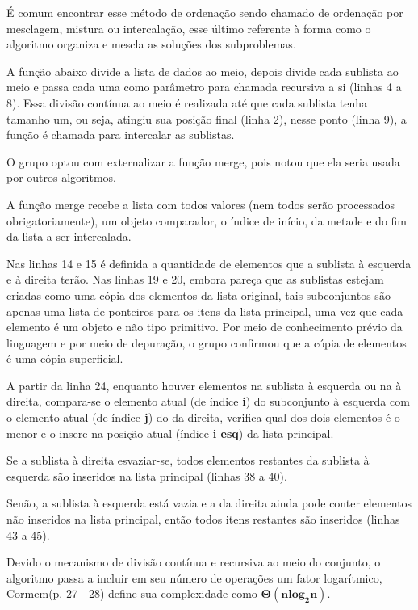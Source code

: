 \documentclass[a4paper,12pt]{scrartcl}
\begin{document}
É comum encontrar esse método de ordenação sendo chamado de ordenação por mesclagem, mistura ou intercalação, esse último referente à forma como o algoritmo organiza e mescla as soluções dos subproblemas.

A função  abaixo divide a lista de dados ao meio, depois divide cada sublista ao meio e passa cada uma como parâmetro para chamada recursiva a si (linhas 4 a 8). Essa divisão contínua ao meio é realizada até que cada sublista tenha tamanho um, ou seja, atingiu sua posição final (linha 2), nesse ponto (linha 9), a função  é chamada para intercalar as sublistas.

O grupo optou com externalizar a função merge, pois notou que ela seria usada por outros algoritmos.

A função merge recebe a lista com todos valores (nem todos serão processados obrigatoriamente), um objeto comparador, o índice de início, da metade e do fim da lista a ser intercalada.

Nas linhas 14 e 15 é definida a quantidade de elementos que a sublista à esquerda e à direita terão. Nas linhas 19 e 20, embora pareça que as sublistas estejam criadas como uma cópia dos elementos da lista original, tais subconjuntos são apenas uma lista de ponteiros para os itens da lista principal, uma vez que cada elemento é um objeto e não tipo primitivo. Por meio de conhecimento prévio da linguagem e por meio de depuração, o grupo confirmou que a cópia de elementos é uma cópia superficial.

A partir da linha 24, enquanto houver elementos na sublista à esquerda ou na à direita, compara-se o elemento atual (de índice \textbf{i}) do subconjunto à esquerda com o elemento atual (de índice \textbf{j}) do da direita, verifica qual dos dois elementos é o menor e o insere na posição atual (índice \textbf{i esq}) da lista principal.

Se a sublista à direita esvaziar-se, todos elementos restantes da sublista à esquerda são inseridos na lista principal (linhas 38 a 40).

Senão, a sublista à esquerda está vazia e a da direita ainda pode conter elementos não inseridos na lista principal, então todos itens restantes são inseridos (linhas 43 a 45).

Devido o mecanismo de divisão contínua e recursiva ao meio do conjunto, o algoritmo passa a incluir em seu número de operações um fator logarítmico, Cormem(p. 27 - 28) define sua complexidade como $\pmb{\Theta(n log_2 n)}$.
\end{document}
